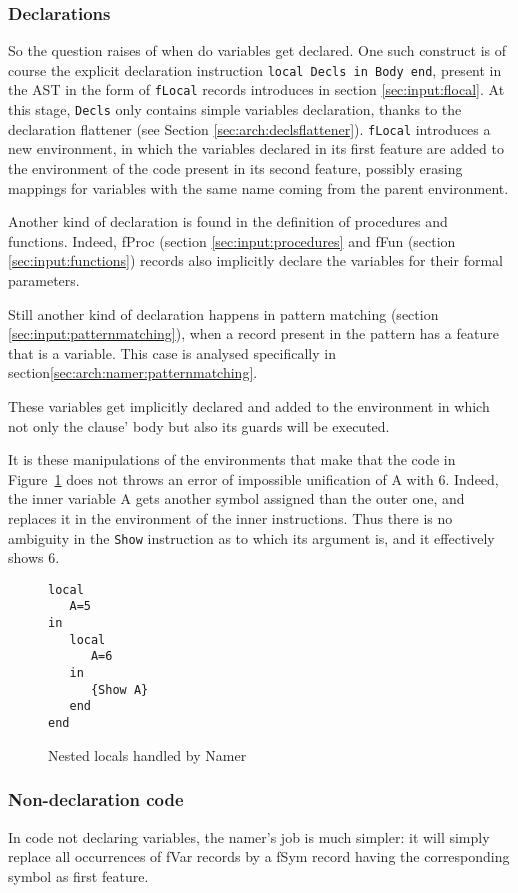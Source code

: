 \documentclass[a4paper]{memoir}
\begin{document}
\subsubsection{Declarations}
So the question raises of when do variables get declared.
One such construct is of course the explicit declaration instruction \lstinline!local Decls in Body end!, present in the AST in the form of \lstinline!fLocal! records introduces in section \ref{sec:input:flocal}. At this stage, \lstinline!Decls! only contains simple variables declaration, thanks to the declaration flattener (see Section \ref{sec:arch:declsflattener}). \lstinline!fLocal! introduces a new environment, in which the variables declared in its first feature are added to the environment of the code present in its second feature, possibly erasing mappings for variables with the same name coming from the parent environment. 

Another kind of declaration is found in the definition of procedures and functions. Indeed, fProc (section \ref{sec:input:procedures} and fFun (section \ref{sec:input:functions}) records also implicitly declare the variables for their formal parameters. %

Still another kind of declaration happens in pattern matching (section \ref{sec:input:patternmatching}), when a record present in the pattern has a feature that is a variable. This case is analysed specifically in section\ref{sec:arch:namer:patternmatching}.

These variables get implicitly declared and added to the environment in which not only the clause' body but also its guards will be executed.


It is these manipulations of the environments that make that the code in Figure~\ref{fig:namer_nested_locals} does not throws an error of impossible unification of A with 6. Indeed, the inner variable A gets another symbol assigned than the outer one, and replaces it in the environment of the inner instructions. Thus there is no ambiguity in the \lstinline!Show! instruction as to which its argument is, and it effectively shows 6.
\begin{figure}
\begin{lstlisting}
local
   A=5
in
   local 
      A=6
   in
      {Show A}
   end
end
\end{lstlisting}
\caption{Nested locals handled by Namer}
\label{fig:namer_nested_locals}
\end{figure}


\subsubsection{Non-declaration code}
In code not declaring variables, the namer's job is much simpler: it will simply
replace all occurrences of fVar records by a fSym record having the corresponding symbol as first feature.
\end{document}
